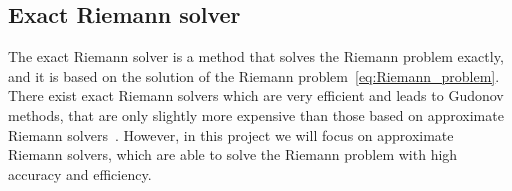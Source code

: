 \subsection{Exact Riemann solver}
The exact Riemann solver is a method that solves the Riemann problem exactly, and it is based on the solution of the Riemann problem~\eqref{eq:Riemann_problem}.
There exist exact Riemann solvers which are very efficient and leads to Gudonov methods, that are only slightly more expensive than those based on approximate Riemann solvers~\cite{Toro2001-Shock}.
However, in this project we will focus on approximate Riemann solvers, which are able to solve the Riemann problem with high accuracy and efficiency.


